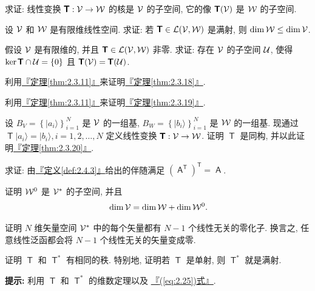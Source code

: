 \documentclass[lang=cn,zihao=-4,twoside,fontset=none]{textbook}
\newcommand{\bsf}[1]{{\mathop{\pmb{\mathsf{#1}}}}}
\def\eq#1{\[\begin{aligned}{}#1\end{aligned}\]}
\renewcommand{\eqref}[1]{\hyperref[#1]{『\textnormal{(\ref*{#1})}式』}}
\newcommand{\thmref}[1]{\hyperref[#1]{『定理\textnormal{\ref*{#1}}』}}
\newcommand{\defref}[1]{\hyperref[#1]{『定义\textnormal{\ref*{#1}}』}}
\newcommand{\set}[1]{\{#1\}}
\newcommand{\Set}[1]{\left\{#1\right\}}
\newcommand{\T}{{\mathsf{T}}}
\renewcommand{\ket}[1]{| #1 \rangle}
\begin{document}
\begin{problem}
    \label{ex:2.26}%
    求证: 线性变换 $\bsf{T}:\mV\to\mW$ 的核是 ${\mathcal V}$ 的子空间, 它的像 $\bsf{T}(\mV)$ 是 ${\mathcal W}$ 的子空间.
\end{problem}

\begin{problem}
    \label{ex:2.27}%
    设 ${\mathcal V}$ 和 ${\mathcal W}$ 是有限维线性空间. 求证: 若 $\bsf{T}\in\mL(\mV,\mW)$ 是满射, 则 $\dim{\mathcal W}\leq\dim{\mathcal V}$. 
\end{problem}

\begin{problem}
    \label{ex:2.28}%
    假设 ${\mathcal V}$ 是有限维的, 并且 $\bsf{T}\in\mL(\mV,\mW)$ 非零. 求证: 存在 ${\mathcal V}$ 的子空间 ${\mathcal U}$, 使得 $\ker\bsf{T}\cap\mU=\set{0}$ 且 $\bsf{T}(\mV)=\bsf{T}(\mU)$.
\end{problem}

\begin{problem}
    \label{ex:2.29}%
    利用\thmref{thm:2.3.11}来证明\thmref{thm:2.3.18}. 
\end{problem}

\begin{problem}
    \label{ex:2.30}%
    利用\thmref{thm:2.3.11}来证明\thmref{thm:2.3.19}.
\end{problem}

\begin{problem}
    \label{ex:2.31}%
    设 $B_V=\Set{\ket{a_i}}_{i=1}^N$ 是 ${\mathcal V}$ 的一组基, $B_W=\Set{\ket{b_i}}_{i=1}^N$ 是 ${\mathcal W}$ 的一组基. 现通过 $\bsf{T}\ket{a_i}=\ket{b_i},i=1,2,\dots,N$ 定义线性变换 $\bsf{T}:\mV\to\mW$. 证明 $\bsf{T}$ 是同构, 并以此证明\thmref{thm:2.3.20}.
\end{problem}

\begin{problem}
    \label{ex:2.32}%
    求证: 由\defref{def:2.4.3}给出的伴随满足 $(\bsf{A}^\T)^\T=\bsf{A}$.
\end{problem}

\begin{problem}
    \label{ex:2.33}%
    证明 ${\mathcal W}^0$ 是 ${\mathcal V}^*$ 的子空间, 并且 
    \eq{
        \dim\mV = \dim\mW + \dim\mW^0.
    }
\end{problem}

\begin{problem}
    \label{ex:2.34}%
    证明 $N$ 维矢量空间 ${\mathcal V}^*$ 中的每个矢量都有 $N-1$ 个线性无关的零化子. 换言之, 任意线性泛函都会将 $N-1$ 个线性无关的矢量变成零.
\end{problem}

\begin{problem}
    \label{ex:2.35}%
    证明 $\bsf{T}$ 和 $\bsf{T}^*$ 有相同的秩. 特别地, 证明若 $\bsf{T}$ 是单射, 则 $\bsf{T}^*$ 就是满射. 

    \noindent\textbf{提示:} 利用 $\bsf{T}$ 和 $\bsf{T}^*$ 的维数定理以及 \eqref{eq:2.25}.
\end{problem}
\end{document}
